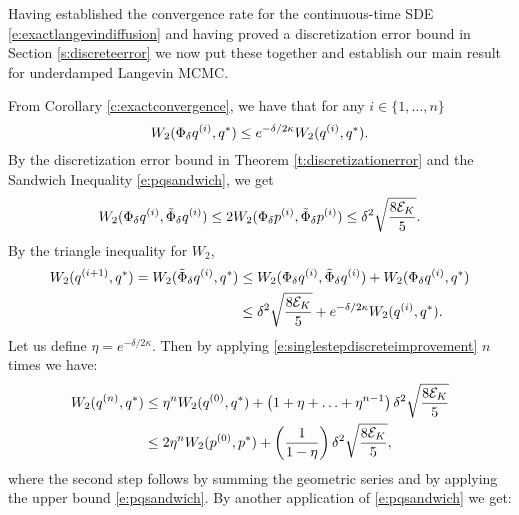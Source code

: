 \label{s:discreteconvergence}
Having established the convergence rate for the continuous-time SDE \eqref{e:exactlangevindiffusion} and having proved a discretization error bound in Section \ref{s:discreteerror} we now put these together and establish our main result for underdamped Langevin MCMC.%
\begin{Proof}
From Corollary \ref{c:exactconvergence}, we have that for any $i \in \{1,\ldots,n \}$
$$W_2(\Phi_\delta q^{(i)},q^*)\leq e^{- \delta/2\kappa}W_2(q^{(i)}, q^*).$$
By the discretization error bound in Theorem \ref{t:discretizationerror} and the Sandwich Inequality \eqref{e:pqsandwich}, we get
$$W_2(\Phi_\delta q^{(i)}, \tilde{\Phi}_\delta q^{(i)})\leq 2W_2(\Phi_\delta p^{(i)}, \tilde{\Phi}_\delta p^{(i)})\leq \delta^2 \sqrt{\frac{8\mathcal{E}_K}{5}}.$$
By the triangle inequality for $W_2$, 
\begin{align}\label{e:singlestepdiscreteimprovement}
W_2(q^{(i+1)}, q^*) = W_2(\tilde{\Phi}_\delta q^{(i)}, q^*) & \le W_2(\Phi_\delta q^{(i)}, \tilde{\Phi}_\delta q^{(i)}) + W_2(\Phi_\delta q^{(i)},q^*)\\
& \le \delta^2 \sqrt{\frac{8\mathcal{E}_K}{5}} + e^{-\delta/2\kappa}W_2(q^{(i)}, q^*) \label{e:singlestepdiscreteimprovement}.
\end{align}
Let us define $\eta = e^{-\delta/ 2\kappa}$. Then by applying \eqref{e:singlestepdiscreteimprovement}  $n$ times we have:
\begin{align*}
W_2(q^{(n)}, q^*) & \le \eta^{n}W_2(q^{(0)}, q^*)+ \left(1+ \eta + \ldots
+ \eta^{n-1} \right)\delta^2 \sqrt{\frac{8\mathcal{E}_K}{5}}\\ 
& \le 2\eta^{n}W_2(p^{(0)}, p^*)+ \left(\frac{1}{1-\eta}\right)\delta^2 \sqrt{\frac{8\mathcal{E}_K}{5}},
\end{align*}
where the second step follows by summing the geometric series and by applying the upper bound \eqref{e:pqsandwich}. By another application of \eqref{e:pqsandwich} we get:

\end{Proof}
